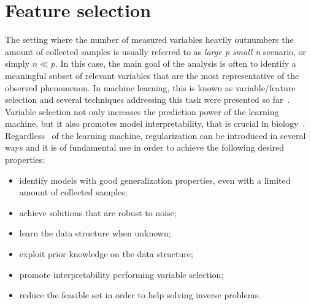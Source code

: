   \section{Feature selection} \label{subsec:feature_selection}
  
%  
  
  The setting where the number of measured variables heavily outnumbers the amount of collected samples is usually referred to as \textit{large p small n} scenario, or simply $n \ll p$. In this case, the main goal of the analysis is often to identify a meaningful subset of relevant variables that are the most representative of the observed phenomenon. In machine learning, this is known as variable/feature selection and several techniques addressing this task were presented so far~\cite{guyon2002gene}. Variable selection not only increases the prediction power of the learning machine, but it also promotes model interpretability, that is crucial in biology~\cite{altmann2010permutation}.
  Regardless~\citep{okser2014regularized} of the learning machine, regularization can be introduced in several ways and it is of fundamental use in order to achieve the following desired properties:
  \begin{itemize}
  	\item identify models with good generalization properties, even with a limited amount of collected samples;
  	\item achieve solutions that are robust to noise;
  	\item learn the data structure when unknown;
  	\item exploit prior knowledge on the data structure;
  	\item promote interpretability performing variable selection;
  	\item reduce the feasible set in order to help solving inverse problems.
  \end{itemize}

